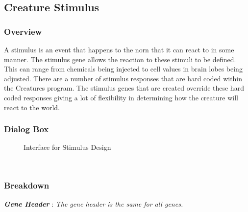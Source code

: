 \documentclass[11pt,twoside,a4paper]{article}
\begin{document}
\subsection{Creature Stimulus} %
\begin{minipage}{0.5\linewidth}
\subsubsection{Overview}
A stimulus is an event that happens to the norn that it can react to in some manner. The stimulus gene allows the reaction to these stimuli to be defined. This can range from chemicals being injected to cell values in brain lobes being adjusted. There are a number of stimulus responses that are hard coded within the Creatures program. The stimulus genes that are created override these hard coded responses giving a lot of flexibility in determining how the creature will react to the world.~\\
\end{minipage}
\begin{minipage}{0.1\linewidth}\end{minipage}
\begin{minipage}{0.4\linewidth}
\subsubsection{Dialog Box}
\begin{figure}[H]
	\centerline {} %
	\caption{Interface for Stimulus Design}
	\label{fig:genes_stimulus}
\end{figure}
\end{minipage}~\\

\clearpage

\subsubsection{Breakdown}

\textbf{\textit{Gene Header}} : \emph{The gene header is the same for all genes.}~\\
\end{document}
